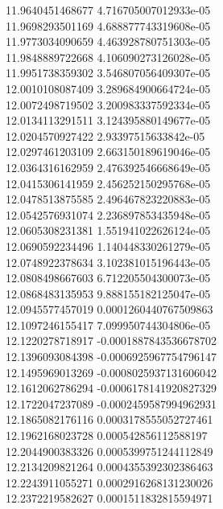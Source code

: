 {11.9640451468677 4.716705007012933e-05 \\
11.9698293501169 4.688877743319608e-05 \\
11.9773034090659 4.463928780751303e-05 \\
11.9848889722668 4.106090273126028e-05 \\
11.9951738359302 3.546807056409307e-05 \\
12.0010108087409 3.289684900664724e-05 \\
12.0072498719502 3.200983337592334e-05 \\
12.0134113291511 3.124395880149677e-05 \\
12.0204570927422 2.93397515633842e-05 \\
12.0297461203109 2.663150189619046e-05 \\
12.0364316162959 2.476392546668649e-05 \\
12.0415306141959 2.456252150295768e-05 \\
12.0478513875585 2.496467823220883e-05 \\
12.0542576931074 2.236897853435948e-05 \\
12.0605308231381 1.551941022626124e-05 \\
12.0690592234496 1.140448330261279e-05 \\
12.0748922378634 3.102381015196443e-05 \\
12.0808498667603 6.712205504300073e-05 \\
12.0868483135953 9.888155182125047e-05 \\
12.0945577457019 0.0001260440767509863 \\
12.1097246155417 7.099950744304806e-05 \\
12.1220278718917 -0.0001887843536678702 \\
12.1396093084398 -0.0006925967754796147 \\
12.1495969013269 -0.0008025937131606042 \\
12.1612062786294 -0.0006178141920827329 \\
12.1722047237089 -0.0002459587994962931 \\
12.1865082176116 0.0003178555052727461 \\
12.1962168023728 0.000542856112588197 \\
12.2044900383326 0.0005399751244112849 \\
12.2134209821264 0.0004355392302386463 \\
12.2243911055271 0.0002916268131230026 \\
12.2372219582627 0.0001511832815594971 \\
}
